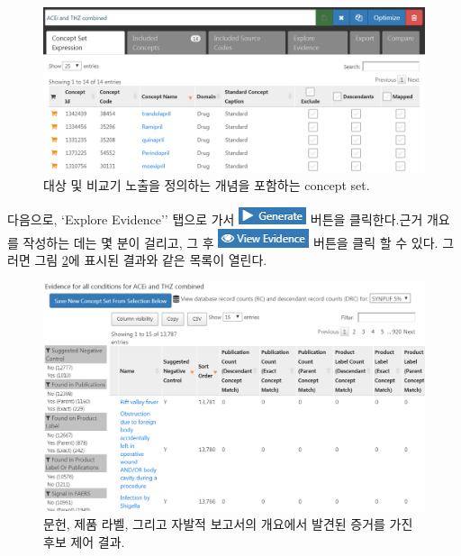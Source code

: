 \documentclass[11pt]{book}
\theoremstyle{definition}
\theoremstyle{definition}
\theoremstyle{definition}
\theoremstyle{remark}
\begin{document}
\begin{figure}

{\centering \includegraphics[width=1\linewidth]{images/MethodValidity/exposuresConceptSet} 

}

\caption{대상 및 비교기 노출을 정의하는 개념을 포함하는 concept set.}\label{fig:exposuresConceptSet}
\end{figure}

다음으로, `Explore Evidence'' 탭으로 가서
\includegraphics{images/MethodValidity/generate.png} 버튼을
클릭한다.근거 개요를 작성하는 데는 몇 분이 걸리고, 그 후
\includegraphics{images/MethodValidity/viewEvidence.png} 버튼을 클릭 할
수 있다. 그러면 그림 \ref{fig:candidateNcs}에 표시된 결과와 같은 목록이
열린다.

\begin{figure}

{\centering \includegraphics[width=1\linewidth]{images/MethodValidity/candidateNcs} 

}

\caption{문헌, 제품 라벨, 그리고 자발적 보고서의 개요에서 발견된 증거를 가진 후보 제어 결과.}\label{fig:candidateNcs}
\end{figure}
\end{document}
